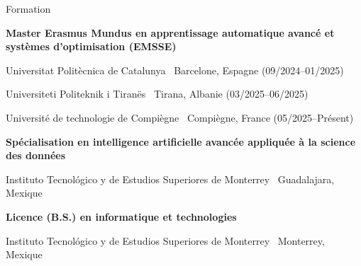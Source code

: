\begin{rubric}{Formation}

\entry*[09/2024 -- Présent]
  \textbf{Master Erasmus Mundus en apprentissage automatique avancé et systèmes d’optimisation (EMSSE)}\par
  Universitat Polit{\`e}cnica de Catalunya \textbar\ Barcelone, Espagne (09/2024--01/2025)\par
  Universiteti Politeknik i Tiran{\"e}s \textbar\ Tirana, Albanie (03/2025--06/2025)\par
  Universit{\'e} de technologie de Compi{\`e}gne \textbar\ Compi{\`e}gne, France (05/2025--Présent)

\entry*[08/2023 -- 12/2024]
  \textbf{Spécialisation en intelligence artificielle avancée appliquée à la science des données}\par
  Instituto Tecnológico y de Estudios Superiores de Monterrey \textbar\ Guadalajara, Mexique

\entry*[08/2021 -- 06/2024]
  \textbf{Licence (B.S.) en informatique et technologies}\par
  Instituto Tecnológico y de Estudios Superiores de Monterrey \textbar\ Monterrey, Mexique

\end{rubric}

